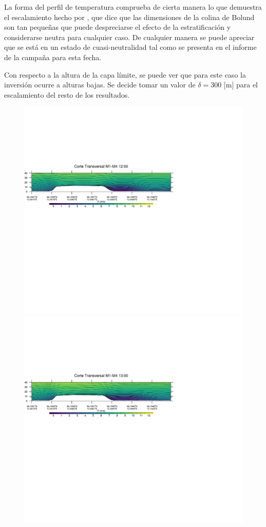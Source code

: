La forma del perfil de temperatura comprueba de cierta manera lo que demuestra el escalamiento hecho por \cite{3d4285ac04444eb3b9775baf9af052c6}, que dice que las dimensiones de la colina de Bolund son tan pequeñas que puede despreciarse el efecto de la estratificación y considerarse neutra para cualquier caso. De cualquier manera se puede apreciar que se está en un estado de cuasi-neutralidad tal como se presenta en el informe de la campaña para esta fecha.

Con respecto a la altura de la capa límite, se puede ver que para este caso la inversión ocurre a alturas bajas. Se decide tomar un valor de $\delta = 300$ [m] para el escalamiento del resto de los resultados.
\begin{figure}[H]
	\centering
	\includegraphics[width=0.90\linewidth,trim={0mm 202.0mm 111mm 106mm},clip]{Imagenes/06/bol/1200rot}\\%
	\includegraphics[width=0.90\linewidth,trim={0mm 202.0mm 111mm 106mm},clip]{Imagenes/06/bol/1300rot}\\%

\end{figure}
